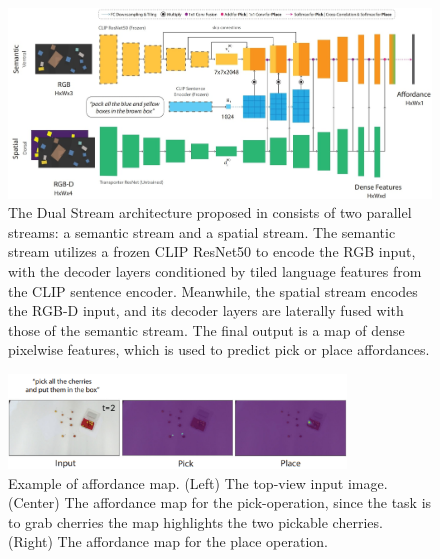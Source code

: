 \begin{figure}[t]
    \centering
    \includegraphics[width=\textwidth]{figures/images/clip_port/architecture.jpg}
    \caption{The Dual Stream architecture proposed in \cite{shridhar2022cliport} consists of two parallel streams: a semantic stream and a spatial stream. The semantic stream utilizes a frozen CLIP ResNet50 to encode the RGB input, with the decoder layers conditioned by tiled language features from the CLIP sentence encoder. Meanwhile, the spatial stream encodes the RGB-D input, and its decoder layers are laterally fused with those of the semantic stream. The final output is a map of dense pixelwise features, which is used to predict pick or place affordances.}
    \label{fig:clip_port_architecture}
\end{figure}

\begin{figure}[t]
    \centering
    \includegraphics[width=0.8\textwidth]{figures/images/clip_port/affordance_map.jpg}
    \caption{Example of affordance map. (Left) The top-view input image. (Center) The affordance map for the pick-operation, since the task is to grab cherries the map highlights the two pickable cherries. (Right) The affordance map for the place operation.}
    \label{fig:clip_port_affordance}
\end{figure}